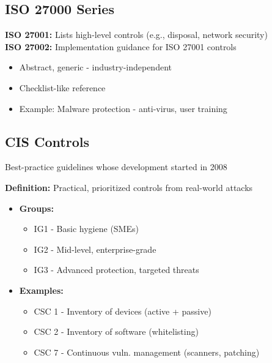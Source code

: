 \subsection{ISO 27000 Series}
{
\textbf{ISO 27001:} Lists high-level controls (e.g., disposal, network security) \\
\textbf{ISO 27002:} Implementation guidance for ISO 27001 controls
\begin{itemize}[noitemsep]
  \item Abstract, generic - industry-independent
  \item Checklist-like reference
  \item Example: Malware protection - anti-virus, user training
\end{itemize}
}
\subsection{CIS Controls}
{
Best-practice guidelines whose development started in 2008

\textbf{Definition:} Practical, prioritized controls from real-world attacks
\begin{itemize}[noitemsep]
  \item \textbf{Groups:}
    \begin{itemize}[noitemsep]
      \item IG1 - Basic hygiene (SMEs)
      \item IG2 - Mid-level, enterprise-grade
      \item IG3 - Advanced protection, targeted threats
    \end{itemize}
  \item \textbf{Examples:}
    \begin{itemize}[noitemsep]
      \item CSC 1 - Inventory of devices (active + passive)
      \item CSC 2 - Inventory of software (whitelisting)
      \item CSC 7 - Continuous vuln. management (scanners, patching)
    \end{itemize}
\end{itemize}
}
